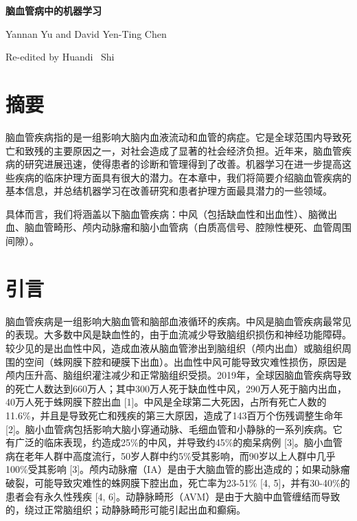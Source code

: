 \documentclass[11pt]{article}
\begin{document}
	
\kaishu 

\thispagestyle{empty}

\begin{center}
	{\bf \Large \kaishu 脑血管病中的机器学习}
	
	\vspace{-0.25cm}
	
	{\large Yannan Yu and David Yen-Ting Chen}
	
	\vspace{-0.25cm}
	
	{Re-edited by Huandi \ Shi}
	
\end{center}

\vspace{-3cm}
	
\tableofcontents
	

\section*{\kaishu 摘要}

脑血管疾病指的是一组影响大脑内血液流动和血管的病症。它是全球范围内导致死亡和致残的主要原因之一，对社会造成了显著的社会经济负担。近年来，脑血管疾病的研究进展迅速，使得患者的诊断和管理得到了改善。机器学习在进一步提高这些疾病的临床护理方面具有很大的潜力。在本章中，我们将简要介绍脑血管疾病的基本信息，并总结机器学习在改善研究和患者护理方面最具潜力的一些领域。

具体而言，我们将涵盖以下脑血管疾病：中风（包括缺血性和出血性）、脑微出血、脑血管畸形、颅内动脉瘤和脑小血管病（白质高信号、腔隙性梗死、血管周围间隙）。

\section{\kaishu  引言}

脑血管疾病是一组影响大脑血管和脑部血液循环的疾病。中风是脑血管疾病最常见的表现。大多数中风是缺血性的，由于血流减少导致脑组织损伤和神经功能障碍。较少见的是出血性中风，造成血液从脑血管渗出到脑组织（颅内出血）或脑组织周围的空间（蛛网膜下腔和硬膜下出血）。出血性中风可能导致灾难性损伤，原因是颅内压升高、脑组织灌注减少和正常脑组织受损。2019年，全球因脑血管疾病导致的死亡人数达到660万人；其中300万人死于缺血性中风，290万人死于脑内出血，40万人死于蛛网膜下腔出血 [1]。中风是全球第二大死因，占所有死亡人数的11.6\%，并且是导致死亡和残疾的第三大原因，造成了143百万个伤残调整生命年 [2]。脑小血管病包括影响大脑小穿通动脉、毛细血管和小静脉的一系列疾病。它有广泛的临床表现，约造成25\%的中风，并导致约45\%的痴呆病例 [3]。脑小血管病在老年人群中高度流行，50岁人群中约5\%受其影响，而90岁以上人群中几乎100\%受其影响 [3]。颅内动脉瘤（IA）是由于大脑血管的膨出造成的；如果动脉瘤破裂，可能导致灾难性的蛛网膜下腔出血，死亡率为23-51\% [4, 5]，并有30-40\%的患者会有永久性残疾 [4, 6]。动静脉畸形（AVM）是由于大脑中血管缠结而导致的，绕过正常脑组织；动静脉畸形可能引起出血和癫痫。
\end{document}
